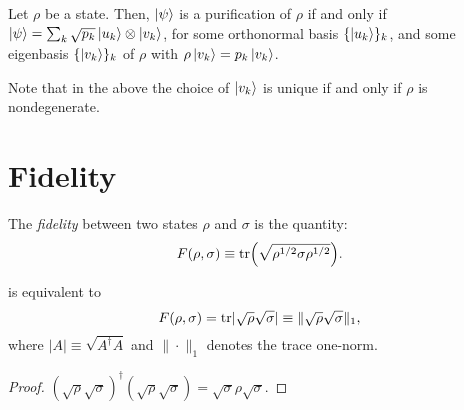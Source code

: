\documentclass[12pt]{report}
\begin{document}
\begin{prop}
	Let $\rho$ be a state. Then, $\ket\psi$ is a purification of $\rho$ if and only if
	$\ket\psi=\sum_k\sqrt{p_k}\ket{u_k}\otimes\ket{v_k}$,
	for some orthonormal basis $\{\ket{u_k}\}_k$, and some eigenbasis $\{\ket{v_k}\}_k$ of $\rho$ with $\rho\ket{v_k}=p_k\ket{v_k}$.
\end{prop}
Note that in the above the choice of $\ket{v_k}$ is unique if and only if $\rho$ is nondegenerate.

\section{Fidelity}

\begin{defn}\label{def:fidelity}
	The \emph{fidelity} between two states $\rho$ and $\sigma$ is the quantity:
	\begin{equation}
		F(\rho,\sigma) \equiv \tr(\sqrt{\rho^{1/2}\sigma\rho^{1/2}}).
	\end{equation}
\end{defn}

\begin{prop}\label{def:fidelity_with_abs}
	 is equivalent to
	\begin{equation}
	F(\rho,\sigma)=\tr\lvert\sqrt\rho\sqrt\sigma\rvert
	\equiv \|\sqrt\rho\sqrt\sigma\|_1,	
	\end{equation}
	where $|A|\equiv\sqrt{A^\dagger A}$ and $\|\cdot\|_1$ denotes the trace one-norm.
\end{prop}
\begin{proof}
	$(\sqrt\rho\sqrt\sigma)^\dagger (\sqrt\rho\sqrt\sigma) = \sqrt\sigma\rho\sqrt\sigma$.
\end{proof}
\end{document}
